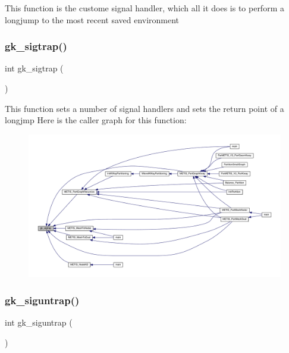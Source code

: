 This function is the custome signal handler, which all it does is to perform a longjump to the most recent saved environment \mbox{\label{a00077_a05869524d1c30cfaab2a8690e7da6fd4}} 
\subsubsection{\texorpdfstring{gk\+\_\+sigtrap()}{gk\_sigtrap()}}
{\footnotesize\ttfamily int gk\+\_\+sigtrap (\begin{DoxyParamCaption}{ }\end{DoxyParamCaption})}

This function sets a number of signal handlers and sets the return point of a longjmp Here is the caller graph for this function\+:\nopagebreak
\begin{figure}[H]
\begin{center}
\leavevmode
\includegraphics[width=350pt]{a00077_a05869524d1c30cfaab2a8690e7da6fd4_icgraph}
\end{center}
\end{figure}
\mbox{\label{a00077_a08f287b6dbdc0779c916ecbd49540a1e}} 
\subsubsection{\texorpdfstring{gk\+\_\+siguntrap()}{gk\_siguntrap()}}
{\footnotesize\ttfamily int gk\+\_\+siguntrap (\begin{DoxyParamCaption}{ }\end{DoxyParamCaption})}

